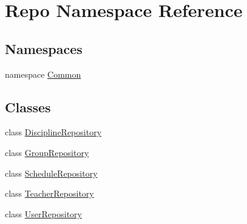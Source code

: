 \hypertarget{namespace_repo}{}\section{Repo Namespace Reference}
\label{namespace_repo}
\subsection*{Namespaces}
\begin{DoxyCompactItemize}
\item 
namespace \hyperlink{namespace_repo_1_1_common}{Common}
\end{DoxyCompactItemize}
\subsection*{Classes}
\begin{DoxyCompactItemize}
\item 
class \hyperlink{class_repo_1_1_discipline_repository}{Discipline\+Repository}
\item 
class \hyperlink{class_repo_1_1_group_repository}{Group\+Repository}
\item 
class \hyperlink{class_repo_1_1_schedule_repository}{Schedule\+Repository}
\item 
class \hyperlink{class_repo_1_1_teacher_repository}{Teacher\+Repository}
\item 
class \hyperlink{class_repo_1_1_user_repository}{User\+Repository}
\end{DoxyCompactItemize}
